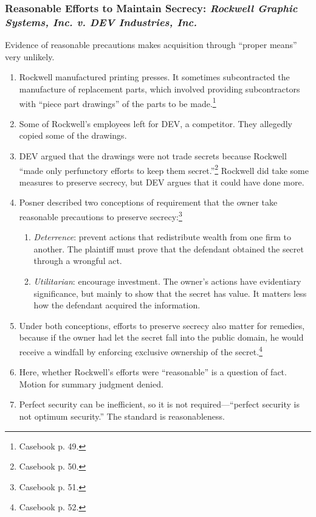 \subsubsection{Reasonable Efforts to Maintain Secrecy: \emph{Rockwell Graphic 
Systems, Inc. v. DEV Industries, Inc.}}

Evidence of reasonable precautions makes acquisition through ``proper means'' 
very unlikely.

\begin{enumerate}
    \item Rockwell manufactured printing presses. It sometimes subcontracted 
    the manufacture of replacement parts, which involved providing 
    subcontractors with ``piece part drawings'' of the parts to be 
    made.\footnote{Casebook p. 49.}
    \item Some of Rockwell's employees left for DEV, a competitor. They 
    allegedly copied some of the drawings.
    \item DEV argued that the drawings were not trade secrets because Rockwell 
    ``made only perfunctory efforts to keep them secret.''\footnote{Casebook 
    p. 50.} Rockwell did take some measures to preserve secrecy, but DEV 
    argues that it could have done more.
    \item Posner described two conceptions of requirement that the owner take 
    reasonable precautions to preserve secrecy:\footnote{Casebook p. 51.}
    \begin{enumerate}
        \item \emph{Deterrence}: prevent actions that redistribute wealth from 
        one firm to another. The plaintiff must prove that the defendant 
        obtained the secret through a wrongful act.
        \item \emph{Utilitarian}: encourage investment. The owner's actions 
        have evidentiary significance, but mainly to show that the secret has 
        value. It matters less how the defendant acquired the information.
    \end{enumerate}
    \item Under both conceptions, efforts to preserve secrecy also matter for 
    remedies, because if the owner had let the secret fall into the public 
    domain, he would receive a windfall by enforcing exclusive ownership of 
    the secret.\footnote{Casebook p. 52.}
    \item Here, whether Rockwell's efforts were ``reasonable'' is a question 
    of fact. Motion for summary judgment denied.
    \item Perfect security can be inefficient, so it is not 
    required---``perfect security is not optimum security.'' The standard is 
    reasonableness.
\end{enumerate}

